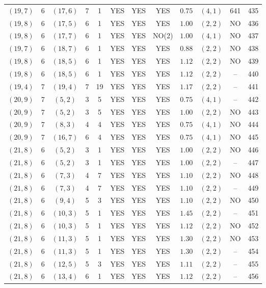 \begin{longtable}{|c|c|c|c|c|c|c|c|c|c|c|c|}
$(19,7)$ & 6 & $(17,6)$ & 7 & 1 & YES & YES & YES & $0.75$ & $(4,1)$ & 641 & 435\\
$(19,8)$ & 6 & $(17,5)$ & 6 & 1 & YES & YES & YES & $1.00$ & $(2,2)$ & NO & 436\\
$(19,8)$ & 6 & $(17,7)$ & 6 & 1 & YES & YES & NO(2) & $1.00$ & $(4,1)$ & NO & 437\\
$(19,7)$ & 6 & $(18,7)$ & 6 & 1 & YES & YES & YES & $0.88$ & $(2,2)$ & NO & 438\\
$(19,8)$ & 6 & $(18,5)$ & 6 & 1 & YES & YES & YES & $1.12$ & $(2,2)$ & NO & 439\\
$(19,8)$ & 6 & $(18,5)$ & 6 & 1 & YES & YES & YES & $1.12$ & $(2,2)$ & -- & 440\\
$(19,4)$ & 7 & $(19,4)$ & 7 & 19 & YES & YES & YES & $1.17$ & $(2,2)$ & -- & 441\\
$(20,9)$ & 7 & $(5,2)$ & 3 & 5 & YES & YES & YES & $0.75$ & $(4,1)$ & -- & 442\\
$(20,9)$ & 7 & $(5,2)$ & 3 & 5 & YES & YES & YES & $1.00$ & $(2,2)$ & NO & 443\\
$(20,9)$ & 7 & $(8,3)$ & 4 & 4 & YES & YES & YES & $0.75$ & $(4,1)$ & NO & 444\\
$(20,9)$ & 7 & $(16,7)$ & 6 & 4 & YES & YES & YES & $0.75$ & $(4,1)$ & NO & 445\\
$(21,8)$ & 6 & $(5,2)$ & 3 & 1 & YES & YES & YES & $1.00$ & $(2,2)$ & NO & 446\\
$(21,8)$ & 6 & $(5,2)$ & 3 & 1 & YES & YES & YES & $1.00$ & $(2,2)$ & -- & 447\\
$(21,8)$ & 6 & $(7,3)$ & 4 & 7 & YES & YES & YES & $1.10$ & $(2,2)$ & NO & 448\\
$(21,8)$ & 6 & $(7,3)$ & 4 & 7 & YES & YES & YES & $1.10$ & $(2,2)$ & -- & 449\\
$(21,8)$ & 6 & $(9,4)$ & 5 & 3 & YES & YES & YES & $1.10$ & $(2,2)$ & NO & 450\\
$(21,8)$ & 6 & $(10,3)$ & 5 & 1 & YES & YES & YES & $1.45$ & $(2,2)$ & -- & 451\\
$(21,8)$ & 6 & $(10,3)$ & 5 & 1 & YES & YES & YES & $1.12$ & $(2,2)$ & NO & 452\\
$(21,8)$ & 6 & $(11,3)$ & 5 & 1 & YES & YES & YES & $1.30$ & $(2,2)$ & NO & 453\\
$(21,8)$ & 6 & $(11,3)$ & 5 & 1 & YES & YES & YES & $1.30$ & $(2,2)$ & -- & 454\\
$(21,8)$ & 6 & $(12,5)$ & 5 & 3 & YES & YES & YES & $1.11$ & $(2,2)$ & -- & 455\\
$(21,8)$ & 6 & $(13,4)$ & 6 & 1 & YES & YES & YES & $1.12$ & $(2,2)$ & -- & 456\\

\end{longtable}
